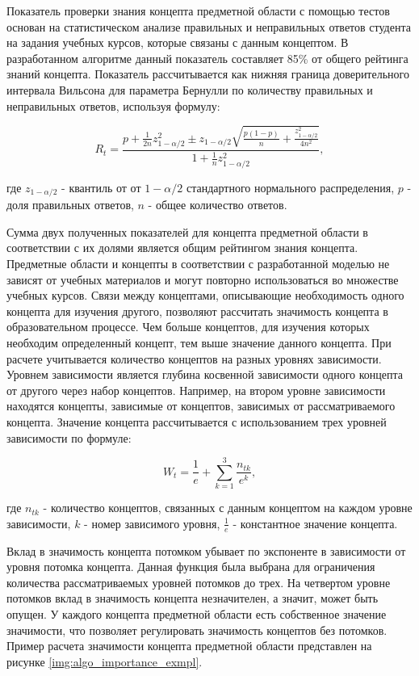 Показатель проверки знания концепта предметной области с помощью тестов основан на статистическом анализе правильных и неправильных ответов студента на задания учебных курсов, которые связаны с данным концептом. В разработанном алгоритме данный показатель составляет 85\% от общего рейтинга знаний концепта. Показатель рассчитывается как нижняя граница доверительного интервала Вильсона для параметра Бернулли по количеству правильных и неправильных ответов, используя формулу:

$$
    R_t = \frac{p+\frac{1}{2n}z_{1-\alpha/2}^2 \pm z_{1-\alpha/2}\sqrt{\frac{p(1-p)}{n}+\frac{z_{1-\alpha/2}^2}{4n^2}}{} }{1+\frac{1}{n}z_{1-\alpha/2}^2},
$$

где \(z_{1-\alpha/2}\) - квантиль от от \(1-\alpha/2\) стандартного нормального распределения, \(p\) - доля правильных ответов, \(n\) - общее количество ответов. 

Сумма двух полученных показателей для концепта предметной области в соответствии с их долями является общим рейтингом знания концепта. Предметные области и концепты в соответствии с разработанной моделью не зависят от учебных материалов и могут повторно использоваться во множестве учебных курсов. Связи между концептами, описывающие необходимость одного концепта для изучения другого, позволяют рассчитать значимость концепта в образовательном процессе. Чем больше концептов, для изучения которых необходим определенный концепт, тем выше значение данного концепта. При расчете учитывается количество концептов на разных уровнях зависимости. Уровнем зависимости является глубина косвенной зависимости одного концепта от другого через набор концептов. Например, на втором уровне зависимости находятся концепты, зависимые от концептов, зависимых от рассматриваемого концепта. Значение концепта рассчитывается с использованием трех уровней зависимости по формуле: 

$$
    W_t = \frac{1}{e}+\sum_{k=1}^{3}\frac{n_{tk}}{e^k}, 
$$

где \(n_{tk}\) - количество концептов, связанных с данным концептом на каждом уровне зависимости, \(k\) - номер зависимого уровня, \( \frac{1}{e} \) - константное значение концепта. 

Вклад в значимость концепта потомком убывает по экспоненте в зависимости от уровня потомка концепта. Данная функция была выбрана для ограничения количества рассматриваемых уровней потомков до трех. На четвертом уровне потомков вклад в значимость концепта незначителен, а значит, может быть опущен. У каждого концепта предметной области есть собственное значение значимости, что позволяет регулировать значимость концептов без потомков. Пример расчета значимости концепта предметной области представлен на рисунке \ref{img:algo_importance_exmpl}.

